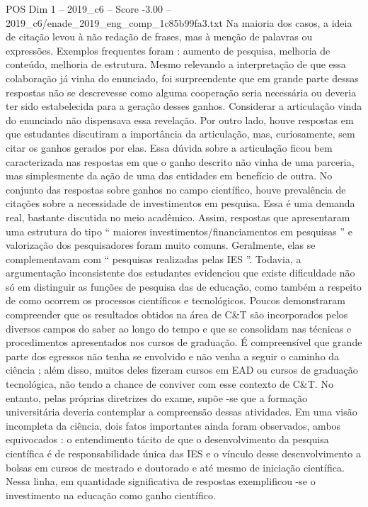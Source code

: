 \begin{textsample}{POS Dim 1 – 2019\_c6 – Score -3.00 – 2019\_c6/enade\_2019\_eng\_comp\_1c85b99fa3.txt}
Na maioria dos casos, a ideia de citação levou à não redação de frases, mas à menção de palavras ou expressões.
Exemplos frequentes foram : aumento de pesquisa, melhoria de conteúdo, melhoria de estrutura.
Mesmo relevando a interpretação de que essa colaboração já vinha do enunciado, foi surpreendente que em grande parte dessas respostas não se descrevesse como alguma cooperação seria necessária ou deveria ter sido estabelecida para a geração desses ganhos.
Considerar a articulação vinda do enunciado não dispensava essa revelação.
Por outro lado, houve respostas em que estudantes discutiram a importância da articulação, mas, curiosamente, sem citar os ganhos gerados por elas.
Essa dúvida sobre a articulação ficou bem caracterizada nas respostas em que o ganho descrito não vinha de uma parceria, mas simplesmente da ação de uma das entidades em benefício de outra.
No conjunto das respostas sobre ganhos no campo científico, houve prevalência de citações sobre a necessidade de investimentos em pesquisa.
Essa é uma demanda real, bastante discutida no meio acadêmico.
Assim, respostas que apresentaram uma estrutura do tipo “ maiores investimentos/financiamentos em pesquisas ” e valorização dos pesquisadores foram muito comuns.
Geralmente, elas se complementavam com “ pesquisas realizadas pelas IES ”.
Todavia, a argumentação inconsistente dos estudantes evidenciou que existe dificuldade não só em distinguir as funções de pesquisa das de educação, como também a respeito de como ocorrem os processos científicos e tecnológicos.
Poucos demonstraram compreender que os resultados obtidos na área de C\&T são incorporados pelos diversos campos do saber ao longo do tempo e que se consolidam nas técnicas e procedimentos apresentados nos cursos de graduação.
É compreensível que grande parte dos egressos não tenha se envolvido e não venha a seguir o caminho da ciência ; além disso, muitos deles fizeram cursos em EAD ou cursos de graduação tecnológica, não tendo a chance de conviver com esse contexto de C\&T.
No entanto, pelas próprias diretrizes do exame, supõe -se que a formação universitária deveria contemplar a compreensão dessas atividades.
Em uma visão incompleta da ciência, dois fatos importantes ainda foram observados, ambos equivocados : o entendimento tácito de que o desenvolvimento da pesquisa científica é de responsabilidade única das IES e o vínculo desse desenvolvimento a bolsas em cursos de mestrado e doutorado e até mesmo de iniciação científica.
Nessa linha, em quantidade significativa de respostas exemplificou -se o investimento na educação como ganho científico.

\end{textsample}
